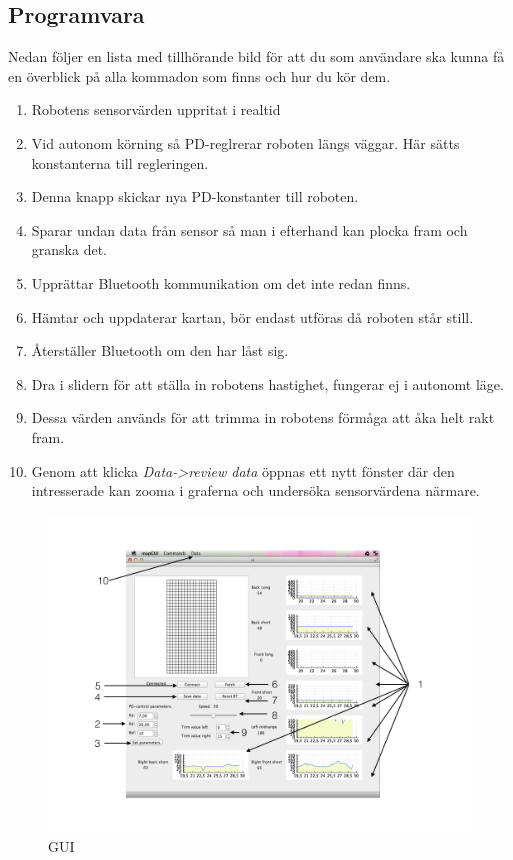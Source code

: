 \documentclass[a4paper,12pt,fleqn]{article}
\begin{document}
\subsection{Programvara}
Nedan följer en lista med tillhörande bild för att du som användare ska kunna få en överblick på alla kommadon som finns och hur du kör dem. 

\begin{enumerate}
	\item Robotens sensorvärden uppritat i realtid  
	\item Vid autonom körning så PD-reglrerar roboten längs väggar. Här sätts konstanterna till regleringen.
	\item Denna knapp skickar nya PD-konstanter till roboten.
	\item Sparar undan data från sensor så man i efterhand kan plocka fram och granska det. 
	\item Upprättar Bluetooth kommunikation om det inte redan finns.
	\item Hämtar och uppdaterar kartan, bör endast utföras då roboten står still.
	\item Återställer Bluetooth om den har låst sig.
	\item Dra i slidern för att ställa in robotens hastighet, fungerar ej i autonomt läge.
	\item Dessa värden används för att trimma in robotens förmåga att åka helt rakt fram. 
	\item Genom att klicka \emph{Data->review data} öppnas ett nytt fönster där den intresserade kan zooma i graferna och undersöka sensorvärdena närmare.  
\end{enumerate}	


\begin{figure}[htp] %
  \begin{center}
  \includegraphics[keepaspectratio=true,width=1\textwidth]{bilder/Gui_manual.png}  %
  \end{center}
  \caption{GUI} %
  \label{fig:reflex} %
\end{figure}
\end{document}

